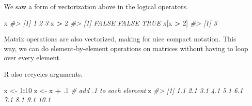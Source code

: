 \documentclass[]{book}
\newenvironment{Shaded}{\begin{snugshade}}{\end{snugshade}}
\newcommand{\CommentTok}[1]{\textcolor[rgb]{0.56,0.35,0.01}{\textit{#1}}}
\newcommand{\DecValTok}[1]{\textcolor[rgb]{0.00,0.00,0.81}{#1}}
\newcommand{\FloatTok}[1]{\textcolor[rgb]{0.00,0.00,0.81}{#1}}
\newcommand{\KeywordTok}[1]{\textcolor[rgb]{0.13,0.29,0.53}{\textbf{#1}}}
\newcommand{\NormalTok}[1]{#1}
\newcommand{\OperatorTok}[1]{\textcolor[rgb]{0.81,0.36,0.00}{\textbf{#1}}}
\newcommand{\StringTok}[1]{\textcolor[rgb]{0.31,0.60,0.02}{#1}}
\theoremstyle{definition}
\theoremstyle{definition}
\theoremstyle{definition}
\theoremstyle{remark}
\begin{document}
We saw a form of vectorization above in the logical operators.

\begin{Shaded}
\begin{Highlighting}[]
\NormalTok{x}
\CommentTok{#> [1] 1 2 3}
\NormalTok{x }\OperatorTok{>}\StringTok{ }\DecValTok{2}
\CommentTok{#> [1] FALSE FALSE  TRUE}
\NormalTok{x[x }\OperatorTok{>}\StringTok{ }\DecValTok{2}\NormalTok{]}
\CommentTok{#> [1] 3}
\end{Highlighting}
\end{Shaded}

Matrix operations are also vectorized, making for nice compact notation.
This way, we can do element-by-element operations on matrices without
having to loop over every element.

\begin{Shaded}
\end{Shaded}

R also recycles arguments.

\begin{Shaded}
\begin{Highlighting}[]
\NormalTok{x <-}\StringTok{ }\DecValTok{1}\OperatorTok{:}\DecValTok{10}
\NormalTok{z <-}\StringTok{ }\NormalTok{x }\OperatorTok{+}\StringTok{ }\FloatTok{.1}  \CommentTok{# add .1 to each element}
\NormalTok{z}
\CommentTok{#>  [1]  1.1  2.1  3.1  4.1  5.1  6.1  7.1  8.1  9.1 10.1}
\end{Highlighting}
\end{Shaded}
\end{document}
